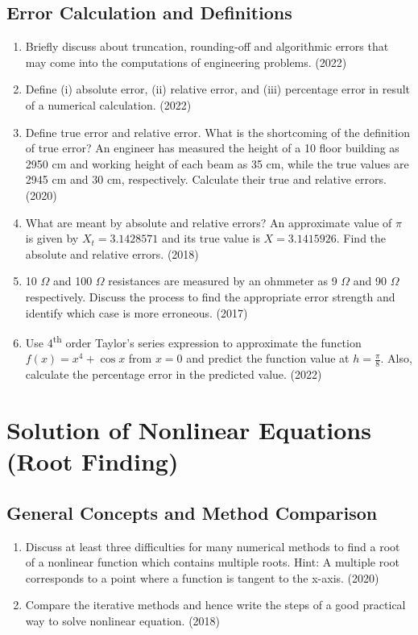 \documentclass[12pt, a4paper]{article}
\begin{document}
	\subsection{Error Calculation and Definitions}
	\begin{enumerate}
		\item Briefly discuss about truncation, rounding-off and algorithmic errors that may come into the computations of engineering problems. (2022)
		\item Define (i) absolute error, (ii) relative error, and (iii) percentage error in result of a numerical calculation. (2022)
		\item Define true error and relative error. What is the shortcoming of the definition of true error? An engineer has measured the height of a 10 floor building as 2950 cm and working height of each beam as 35 cm, while the true values are 2945 cm and 30 cm, respectively. Calculate their true and relative errors. (2020)
		\item What are meant by absolute and relative errors? An approximate value of $\pi$ is given by $X_t = 3.1428571$ and its true value is $X = 3.1415926$. Find the absolute and relative errors. (2018)
		\item 10 $\Omega$ and 100 $\Omega$ resistances are measured by an ohmmeter as 9 $\Omega$ and 90 $\Omega$ respectively. Discuss the process to find the appropriate error strength and identify which case is more erroneous. (2017)
		\item Use 4\textsuperscript{th} order Taylor's series expression to approximate the function $f(x) = x^4 + \cos x$ from $x=0$ and predict the function value at $h = \frac{\pi}{8}$. Also, calculate the percentage error in the predicted value. (2022)
	\end{enumerate}
	
	
	\section{Solution of Nonlinear Equations (Root Finding)}
	
	\subsection{General Concepts and Method Comparison}
	\begin{enumerate}
		\item Discuss at least three difficulties for many numerical methods to find a root of a nonlinear function which contains multiple roots. Hint: A multiple root corresponds to a point where a function is tangent to the x-axis. (2020)
		\item Compare the iterative methods and hence write the steps of a good practical way to solve nonlinear equation. (2018)
	\end{enumerate}
	
\end{document}

